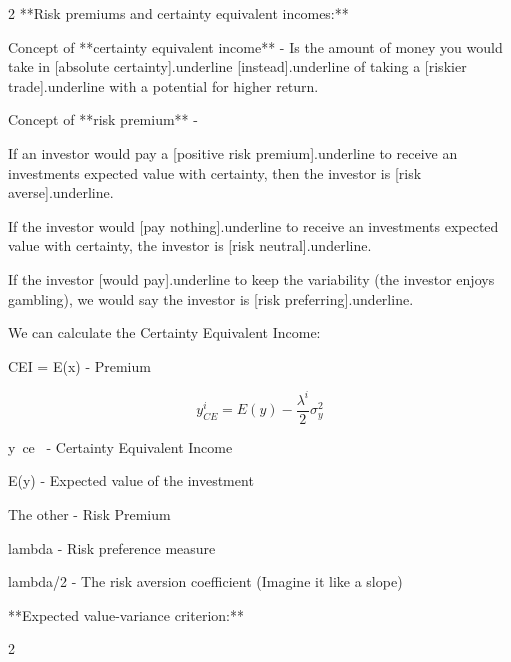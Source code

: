 \documentclass{article}
\begin{document}
\begin{multicols}{2}
**Risk premiums and certainty equivalent incomes:**

Concept of **certainty equivalent income** - Is the amount of money you would take in [absolute certainty]{.underline} [instead]{.underline} of taking a [riskier trade]{.underline} with a potential for higher return.

Concept of **risk premium** -

If an investor would pay a [positive risk premium]{.underline} to receive an investments expected value with certainty, then the investor is [risk averse]{.underline}.

If the investor would [pay nothing]{.underline} to receive an investments expected value with certainty, the investor is [risk neutral]{.underline}.

If the investor [would pay]{.underline} to keep the variability (the investor enjoys gambling), we would say the investor is [risk preferring]{.underline}.

We can calculate the Certainty Equivalent Income:

CEI = E(x) - Premium

$$
y_{C E}^i=E(y)-\frac{\lambda^i}{2} \sigma_y^2
$$

y~ce~ - Certainty Equivalent Income

E(y) - Expected value of the investment

The other - Risk Premium

lambda - Risk preference measure

lambda/2 - The risk aversion coefficient (Imagine it like a slope)

**Expected value-variance criterion:**

\end{multicols}{2}  
\end{document}
